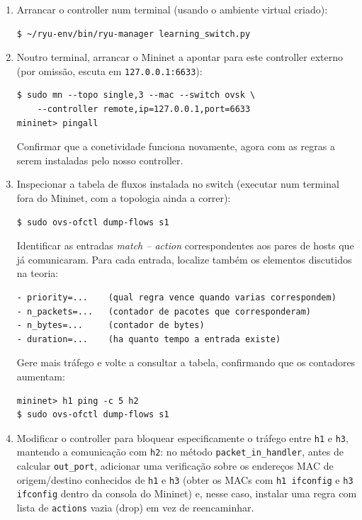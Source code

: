 \documentclass[11pt,a4paper]{article}
\begin{document}
\begin{enumerate}[label=\arabic*.,resume]
\begin{lstlisting}
        data = msg.data if msg.buffer_id == ofproto.OFP_NO_BUFFER else None
        out = parser.OFPPacketOut(datapath=datapath, buffer_id=msg.buffer_id,
                                   in_port=in_port, actions=actions, data=data)
        datapath.send_msg(out)
\end{lstlisting}

  \item Arrancar o controller num terminal (usando o ambiente virtual criado):
\begin{lstlisting}
$ ~/ryu-env/bin/ryu-manager learning_switch.py
\end{lstlisting}

  \item Noutro terminal, arrancar o Mininet a apontar para este controller externo (por omissão, escuta em \texttt{127.0.0.1:6633}):
\begin{lstlisting}
$ sudo mn --topo single,3 --mac --switch ovsk \
    --controller remote,ip=127.0.0.1,port=6633
mininet> pingall
\end{lstlisting}
  Confirmar que a conetividade funciona novamente, agora com as regras a serem instaladas pelo nosso controller.

  \item Inspecionar a tabela de fluxos instalada no switch (executar num terminal fora do Mininet, com a topologia ainda a correr):
\begin{lstlisting}
$ sudo ovs-ofctl dump-flows s1
\end{lstlisting}
  Identificar as entradas \emph{match -- action} correspondentes aos pares de hosts que já comunicaram. Para cada entrada, localize também os elementos discutidos na teoria:
\begin{lstlisting}
- priority=...    (qual regra vence quando varias correspondem)
- n_packets=...   (contador de pacotes que corresponderam)
- n_bytes=...     (contador de bytes)
- duration=...    (ha quanto tempo a entrada existe)
\end{lstlisting}
  Gere mais tráfego e volte a consultar a tabela, confirmando que os contadores aumentam:
\begin{lstlisting}
mininet> h1 ping -c 5 h2
$ sudo ovs-ofctl dump-flows s1
\end{lstlisting}

  \item Modificar o controller para bloquear especificamente o tráfego entre \texttt{h1} e \texttt{h3}, mantendo a comunicação com \texttt{h2}: no método \texttt{packet\_in\_handler}, antes de calcular \texttt{out\_port}, adicionar uma verificação sobre os endereços MAC de origem/destino conhecidos de \texttt{h1} e \texttt{h3} (obter os MACs com \texttt{h1 ifconfig} e \texttt{h3 ifconfig} dentro da consola do Mininet) e, nesse caso, instalar uma regra com lista de \texttt{actions} vazia (drop) em vez de reencaminhar.


\end{enumerate}
\end{document}
